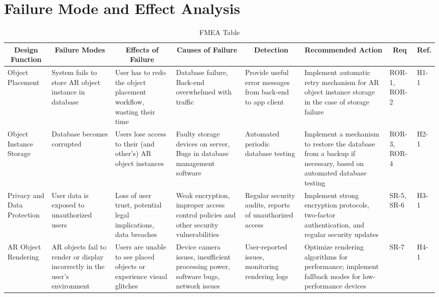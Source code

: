 \documentclass{article}
\begin{document}
\section{Failure Mode and Effect Analysis}

\begin{landscape}
\begin{table}[hp]
    \caption{FMEA Table} \label{FMEA}
    \centering
    \begin{footnotesize}
    \begin{tabular}{|p{1in}|p{1in}|p{1.5in}|p{1.5in}|p{1.5in}|p{2in}|p{0.4in}|p{0.4in}|}
        \hline
        \multicolumn{1}{|c|}{\textbf{Design Function}} & \multicolumn{1}{c|}{\textbf{Failure Modes}} & \multicolumn{1}{c|}{\textbf{Effects of Failure}} & \multicolumn{1}{c|}{\textbf{Causes of Failure}} & \multicolumn{1}{|c|}{\textbf{Detection}} & \multicolumn{1}{c|}{\textbf{Recommended Action}} & \multicolumn{1}{c|}{\textbf{Req}} & \multicolumn{1}{c|}{\textbf{Ref.}} \\
        \hline
        Object Placement & System fails to store AR object instance in database & User has to redo the object placement workflow, wasting their time & Database failure, Back-end overwhelmed with traffic & Provide useful error messages from back-end to app client & Implement automatic retry mechanism for AR object instance storage in the case of storage failure & ROR-1, ROR-2 & H1-1\\
        \hline
        Object Instance Storage & Database becomes corrupted & Users lose access to their (and other's) AR object instances & Faulty storage devices on server, Bugs in database management software & Automated periodic database testing & Implement a mechanism to restore the database from a backup if necessary, based on automated database testing & ROR-3, ROR-4 & H2-1 \\
        \hline
        Privacy and Data Protection & User data is exposed to unauthorized users & Loss of user trust, potential legal implications, data breaches & Weak encryption, improper access control policies and other security vulnerabilities & Regular security audits, reports of unauthorized access & Implement strong encryption protocols, two-factor authentication, and regular security updates & SR-5, SR-6 & H3-1 \\
        \hline
        AR Object Rendering &  AR objects fail to render or display incorrectly in the user's environment & Users are unable to see placed objects or experience visual glitches & Device camera issues, insufficient processing power, software bugs, network issues & User-reported issues, monitoring rendering logs & Optimize rendering algorithms for performance; implement fallback modes for low-performance devices & SR-7 & H4-1 \\

\end{tabular}
\end{footnotesize}
\end{table}
\end{landscape}
\end{document}
